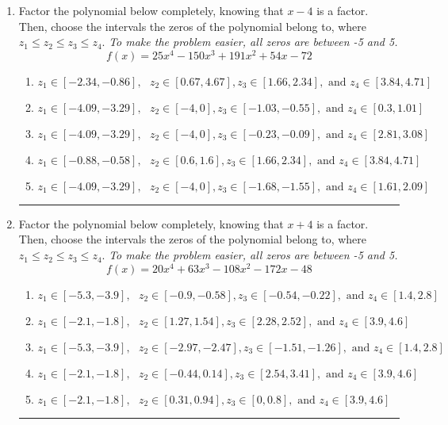 \documentclass[14pt]{extbook}
\newcommand{\litem}[1]{\item#1\hspace*{-1cm}\rule{\textwidth}{0.4pt}}
\begin{document}
\begin{enumerate}
{\begin{enumerate}[label=\Alph*.]
\end{enumerate} }
\litem{
Factor the polynomial below completely, knowing that $x-4$ is a factor. Then, choose the intervals the zeros of the polynomial belong to, where $z_1 \leq z_2 \leq z_3 \leq z_4$. \textit{To make the problem easier, all zeros are between -5 and 5.}\[ f(x) = 25x^{4} -150 x^{3} +191 x^{2} +54 x -72 \]\begin{enumerate}[label=\Alph*.]
\item \( z_1 \in [-2.34, -0.86], \text{   }  z_2 \in [0.67, 4.67], z_3 \in [1.66, 2.34], \text{   and   } z_4 \in [3.84, 4.71] \)
\item \( z_1 \in [-4.09, -3.29], \text{   }  z_2 \in [-4, 0], z_3 \in [-1.03, -0.55], \text{   and   } z_4 \in [0.3, 1.01] \)
\item \( z_1 \in [-4.09, -3.29], \text{   }  z_2 \in [-4, 0], z_3 \in [-0.23, -0.09], \text{   and   } z_4 \in [2.81, 3.08] \)
\item \( z_1 \in [-0.88, -0.58], \text{   }  z_2 \in [0.6, 1.6], z_3 \in [1.66, 2.34], \text{   and   } z_4 \in [3.84, 4.71] \)
\item \( z_1 \in [-4.09, -3.29], \text{   }  z_2 \in [-4, 0], z_3 \in [-1.68, -1.55], \text{   and   } z_4 \in [1.61, 2.09] \)

\end{enumerate} }
\litem{
Factor the polynomial below completely, knowing that $x+4$ is a factor. Then, choose the intervals the zeros of the polynomial belong to, where $z_1 \leq z_2 \leq z_3 \leq z_4$. \textit{To make the problem easier, all zeros are between -5 and 5.}\[ f(x) = 20x^{4} +63 x^{3} -108 x^{2} -172 x -48 \]\begin{enumerate}[label=\Alph*.]
\item \( z_1 \in [-5.3, -3.9], \text{   }  z_2 \in [-0.9, -0.58], z_3 \in [-0.54, -0.22], \text{   and   } z_4 \in [1.4, 2.8] \)
\item \( z_1 \in [-2.1, -1.8], \text{   }  z_2 \in [1.27, 1.54], z_3 \in [2.28, 2.52], \text{   and   } z_4 \in [3.9, 4.6] \)
\item \( z_1 \in [-5.3, -3.9], \text{   }  z_2 \in [-2.97, -2.47], z_3 \in [-1.51, -1.26], \text{   and   } z_4 \in [1.4, 2.8] \)
\item \( z_1 \in [-2.1, -1.8], \text{   }  z_2 \in [-0.44, 0.14], z_3 \in [2.54, 3.41], \text{   and   } z_4 \in [3.9, 4.6] \)
\item \( z_1 \in [-2.1, -1.8], \text{   }  z_2 \in [0.31, 0.94], z_3 \in [0, 0.8], \text{   and   } z_4 \in [3.9, 4.6] \)


\end{enumerate}}
\end{enumerate}
\end{document}
